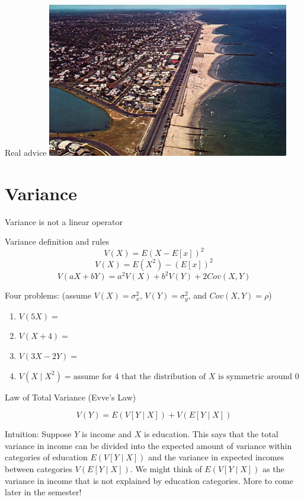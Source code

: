 \documentclass{beamer}
\begin{document}
\begin{frame}{Real advice}
\centering\includegraphics[scale=.5]{figures/Belmar_aerial.jpg}
\end{frame}

\section{Variance}
\begin{frame}{Variance is not a linear operator}
\begin{block}{Variance definition and rules}
$$V(X)=E(X-E[x])^2$$
$$V(X)=E(X^2)-(E[x])^2$$
$$V(aX+bY)=a^2V(X)+b^2V(Y)+2Cov(X,Y)$$
\end{block}
\begin{small}
Four problems: (assume $V(X)=\sigma^2_x$, $V(Y)=\sigma^2_y$, and $Cov(X,Y)=\rho$)
\begin{enumerate}
\item $V(5X) =$
\item $V(X+4) =$ 
\item $V(3X-2Y) = $
\item $V(X\mid X^2) = \text{assume for 4 that the distribution of }X\text{ is symmetric around 0}$
\end{enumerate}
\end{small}
\end{frame}

\begin{frame}{Law of Total Variance (Evve's Law)}
\begin{theorem}
$$V(Y)=E(V[Y\mid X])+V(E[Y\mid X])$$
\end{theorem}
\alert{Intuition:} Suppose $Y$ is income and $X$ is education. This says that the total variance in income can be divided into the expected amount of \alert{variance within categories} of education $E(V[Y\mid X])$ and the variance in expected incomes \alert{between categories} $V(E[Y\mid X])$.
\newline
\newline
We might think of $E(V[Y\mid X])$ as the variance in income that is not explained by education categories. More to come later in the semester!
\end{frame}
\end{document}
